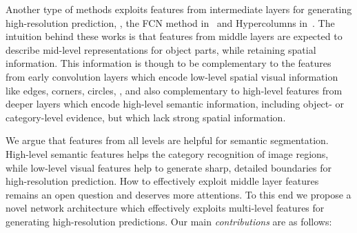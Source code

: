 \documentclass[10pt,twocolumn,letterpaper]{article}
\begin{document}
Another type of methods exploits features from intermediate layers for generating high-resolution prediction, \eg, the FCN method in~\cite{LongSD14} and Hypercolumns in~\cite{hariharan2014hypercolumns}.
The intuition behind these works is that features from middle layers are expected to describe mid-level representations for object parts, while retaining spatial information. This information is though to be complementary to the features from early convolution layers which encode low-level spatial visual information like edges, corners, circles, \etc, and also complementary to high-level features from deeper layers which encode high-level semantic information, including object- or category-level evidence, but which lack strong spatial information.


We argue that features from all levels are helpful for semantic segmentation. High-level semantic features helps the category recognition of image regions, while low-level visual features help to generate sharp, detailed boundaries for high-resolution prediction.  
How to effectively exploit middle layer features remains an open question and deserves more attentions.
To this end we propose a novel network architecture which effectively exploits multi-level features for generating high-resolution predictions.
Our main \emph{contributions} are as follows:
\vspace{-2pt}
\end{document}
